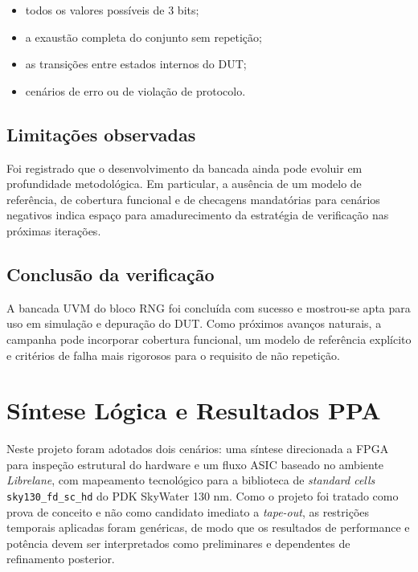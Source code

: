 \documentclass[12pt,a4paper]{article}
\begin{document}
	\vspace{0.5cm}
	
	\begin{itemize}[leftmargin=1.4em]
		\item todos os valores possíveis de 3 bits;
		\item a exaustão completa do conjunto sem repetição;
		\item as transições entre estados internos do DUT;
		\item cenários de erro ou de violação de protocolo.
	\end{itemize}
	
	\subsection*{Limitações observadas}
	
	Foi registrado que o desenvolvimento da bancada ainda pode evoluir em profundidade metodológica. Em particular, a ausência de um modelo de referência, de cobertura funcional e de checagens mandatórias para cenários negativos indica espaço para amadurecimento da estratégia de verificação nas próximas iterações.
	
	\subsection*{Conclusão da verificação}
	
	A bancada UVM do bloco RNG foi concluída com sucesso e mostrou-se apta para uso em simulação e depuração do DUT. Como próximos avanços naturais, a campanha pode incorporar cobertura funcional, um modelo de referência explícito e critérios de falha mais rigorosos para o requisito de não repetição.
	
	
	\clearpage
	
	\section{Síntese Lógica e Resultados PPA}
	
	Neste projeto foram adotados dois cenários: uma síntese direcionada a FPGA para inspeção estrutural do hardware e um fluxo ASIC baseado no ambiente \textit{Librelane}, com mapeamento tecnológico para a biblioteca de \textit{standard cells} \texttt{sky130\_fd\_sc\_hd} do PDK SkyWater 130 nm. Como o projeto foi tratado como prova de conceito e não como candidato imediato a \textit{tape-out}, as restrições temporais aplicadas foram genéricas, de modo que os resultados de performance e potência devem ser interpretados como preliminares e dependentes de refinamento posterior. 
	
\end{document}
